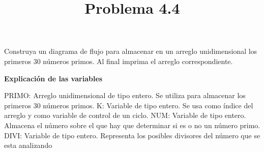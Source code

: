 \documentclass[11pt]{amsart}
\title{Problema 4.4}
\begin{document}
\maketitle
\noindent  Construya un diagrama de flujo para almacenar en un arreglo unidimensional los primeros 30 números primos. Al final imprima el arreglo correspondiente. \newline

\noindent  \textbf{Explicación de las variables} \newline

\noindent PRIMO: \hspace{0.5cm} Arreglo unidimensional de tipo entero. Se utiliza para almacenar los primeros 30 números primos.\newline
\noindent K: \hspace{0.5cm} Variable de tipo entero. Se usa como índice del arreglo y como va­riable de control de un ciclo.\newline
\noindent NUM: \hspace{0.5cm} Variable de tipo entero. Almacena el número sobre el que hay que determinar si es o no un número primo.\newline
\noindent DIVI: \hspace{0.5cm} Variable de tipo entero. Representa los posibles divisores del número que se esta analizando\newline
\end{document}

